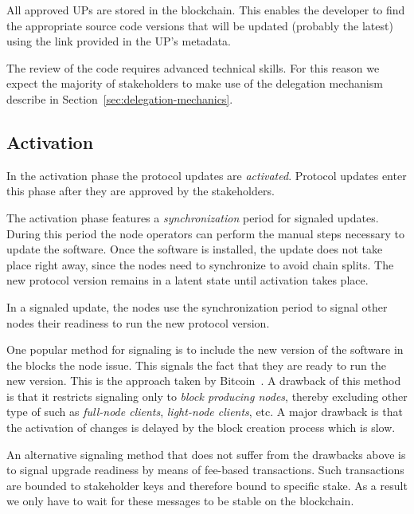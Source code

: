 \documentclass[11pt,a4paper]{article}
\begin{document}

All approved UPs are stored in the blockchain. This enables the developer to
find the appropriate source code versions that will be updated (probably the
latest) using the link provided in the UP's metadata.

The review of the code requires advanced technical skills. For this reason we
expect the majority of stakeholders to make use of the delegation mechanism
describe in Section~\ref{sec:delegation-mechanics}.

\subsection{Activation}
\label{sec:activation}

In the activation phase the protocol updates are \emph{activated}. Protocol
updates enter this phase after they are approved by the stakeholders.

The activation phase features a \emph{synchronization} period for signaled
updates. During this period the node operators can perform the manual steps
necessary to update the software. Once the software is installed, the update
does not take place right away, since the nodes need to synchronize to avoid
chain splits. The new protocol version remains in a latent state until
activation takes place.

In a signaled update, the nodes use the synchronization period to signal other
nodes their readiness to run the new protocol version.

One popular method for signaling is to include the new version of the software
in the blocks the node issue. This signals the fact that they are ready to run
the new version. This is the approach taken by Bitcoin~\cite{bitcoin}. A
drawback of this method is that it restricts signaling only to \emph{block
  producing nodes}, thereby excluding other type of such as \emph{full-node
  clients}, \emph{light-node clients}, etc. A major drawback is that the
activation of changes is delayed by the block creation process which is slow.

An alternative signaling method that does not suffer from the drawbacks above is
to signal upgrade readiness by means of fee-based transactions. Such
transactions are bounded to stakeholder keys and therefore bound to specific
stake.
%
As a result we only have to wait for these messages to be stable on the
blockchain.
\end{document}
